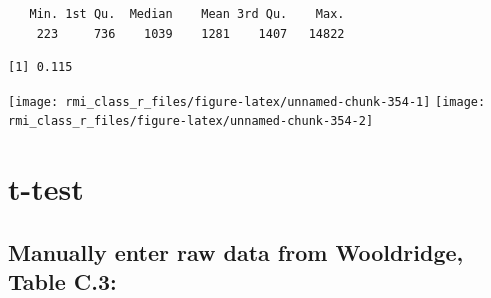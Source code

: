 \documentclass[]{book}
\newenvironment{Shaded}{\begin{snugshade}}{\end{snugshade}}
\newcommand{\CommentTok}[1]{\textcolor[rgb]{0.56,0.35,0.01}{\textit{#1}}}
\newcommand{\DataTypeTok}[1]{\textcolor[rgb]{0.13,0.29,0.53}{#1}}
\newcommand{\KeywordTok}[1]{\textcolor[rgb]{0.13,0.29,0.53}{\textbf{#1}}}
\newcommand{\NormalTok}[1]{#1}
\newcommand{\OperatorTok}[1]{\textcolor[rgb]{0.81,0.36,0.00}{\textbf{#1}}}
\theoremstyle{definition}
\theoremstyle{definition}
\theoremstyle{definition}
\theoremstyle{remark}
\begin{document}
\begin{Shaded}
\end{Shaded}

\begin{verbatim}
   Min. 1st Qu.  Median    Mean 3rd Qu.    Max. 
    223     736    1039    1281    1407   14822 
\end{verbatim}

\begin{Shaded}
\end{Shaded}

\begin{verbatim}
[1] 0.115
\end{verbatim}

\begin{Shaded}
\end{Shaded}

\begin{center}\texttt{[image: rmi\_class\_r\_files/figure-latex/unnamed-chunk-354-1]} \texttt{[image: rmi\_class\_r\_files/figure-latex/unnamed-chunk-354-2]} \end{center}

\hypertarget{t-test}{%
\section{t-test}\label{t-test}}

\hypertarget{manually-enter-raw-data-from-wooldridge-table-c.3}{%
\subsection{Manually enter raw data from Wooldridge, Table
C.3:}\label{manually-enter-raw-data-from-wooldridge-table-c.3}}
\end{document}
